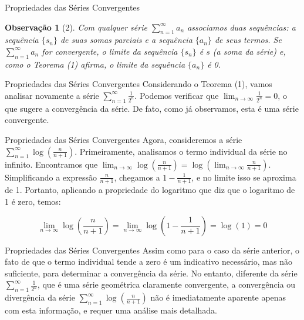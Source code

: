 \documentclass[brazil]{beamer}
\newtheorem{observation}{Observação}\theoremstyle{definition}
\begin{document}
	\begin{frame}{Propriedades das Séries Convergentes}
		
		\begin{observation}[2]
			\justifying
			Com qualquer série $\displaystyle\sum_{n=1}^{\infty} a_n$ associamos duas sequências: a sequência $\{s_n\}$ de suas somas parciais e a sequência $\{a_n\}$ de seus termos. Se $\displaystyle\sum_{n=1}^{\infty} a_n$ for convergente, o limite da sequência $\{s_n\}$ é $s$ (a soma da série) e, como o Teorema (1) afirma, o limite da sequência $\{a_n\}$ é 0.
		\end{observation}
	\end{frame}
	
	\begin{frame}{Propriedades das Séries Convergentes}
		\justifying
		Considerando o Teorema (1), vamos analisar novamente a série $\displaystyle\sum_{n=1}^{\infty} \frac{1}{2^n}$. Podemos  verificar que $\displaystyle\lim_{n \to \infty} \frac{1}{2^n} = 0$, o que sugere a convergência da série. De fato, como já observamos, esta é uma série convergente.
	\end{frame}
	\begin{frame}{Propriedades das Séries Convergentes}
		\justifying
		Agora, consideremos a série $\displaystyle\sum_{n=1}^{\infty} \log \left(\frac{n}{n+1}\right)$. Primeiramente, analisamos o termo individual da série no infinito. Encontramos que $\displaystyle\lim_{n \to \infty} \log \left(\frac{n}{n+1}\right) = \log \left(\lim_{n \to \infty} \frac{n}{n+1}\right)$. Simplificando a expressão $\frac{n}{n+1}$, chegamos a $1 - \frac{1}{n+1}$, e no limite isso se aproxima de 1. Portanto, aplicando a propriedade do logaritmo que diz que o logaritmo de 1 é zero, temos:
		
		$$\lim_{n \to \infty} \log \left(\frac{n}{n+1}\right) = \lim_{n \to \infty} \log (1 - \frac{1}{n+1}) = \log (1) = 0$$
	\end{frame}
	\begin{frame}{Propriedades das Séries Convergentes}
		\justifying
		Assim como para o caso da série anterior, o fato de que o termo individual tende a zero é um indicativo necessário, mas não suficiente, para determinar a convergência da série. No entanto, diferente da série $\displaystyle\sum_{n=1}^{\infty} \frac{1}{2^n}$, que é uma série geométrica claramente convergente, a convergência ou divergência da série $\displaystyle\sum_{n=1}^{\infty} \log \left(\frac{n}{n+1}\right)$ não é imediatamente aparente apenas com esta informação, e requer uma análise mais detalhada.
		
	\end{frame}
\end{document}
